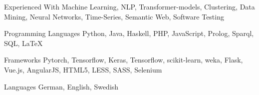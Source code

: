 \begin{cvskills}
	\cvskill
	{Experienced With}
	{Machine Learning, NLP, Transformer-models, Clustering, Data Mining, Neural Networks, Time-Series, Semantic Web, Software Testing}

	\cvskill
	{Programming Languages} %
	{Python, Java, Haskell, PHP, JavaScript, Prolog, Sparql, SQL, LaTeX} %

	\cvskill
	{Frameworks} %
	{Pytorch, Tensorflow, Keras, Tensorflow, scikit-learn, weka, Flask, Vue.js, AngularJS, HTML5, LESS, SASS, Selenium} %

	\cvskill
	{Languages} %
	{German, English, Swedish} %

\end{cvskills}
